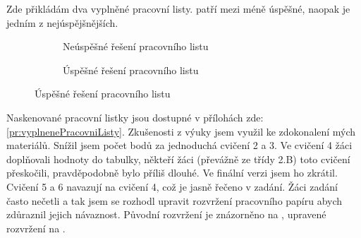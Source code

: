 {Zde přikládám dva vyplněné pracovní listy.  patří mezi méně úspěšné, naopak  je jedním z nejúspějšnějších.}
\begin{figure}[H]
    \begingroup
    \makeatletter
    \renewcommand\thesubfigure{\thefigure~--~\@nameuse{subfiglabel@\alph{subfigure}}}
    \newcommand{\subfiglabel@a}{nahoře}
    \newcommand{\subfiglabel@b}{dole}
    \captionsetup[subfigure]{labelformat=simple, labelsep=colon}
    \renewcommand\p@subfigure{}
    \makeatother
    \begin{subfigure}{\textwidth}
        \centering
        \hspace{1cm}
        \caption{Neúspěšné řešení pracovního listu \jaObr}
        \label{obr:prikladNeuspesny}
    \end{subfigure}\odst
    \begin{subfigure}{\textwidth}
        \centering
        \hspace{1cm}
        \caption{Úspěšné řešení pracovního listu \jaObr}
        \label{obr:prikladUspesny}
    \end{subfigure}
    \endgroup
\end{figure}
{Naskenované pracovní listky jsou dostupné v přílohách zde: \ref{pr:vyplnenePracovniListy}.}
\newpage
{Zkušenosti z výuky jsem využil ke zdokonalení mých materiálů. Snížil jsem počet bodů za jednoduchá cvičení 2 a 3. Ve cvičení 4 žáci doplňovali hodnoty do tabulky, někteří žáci (převážně ze třídy 2.B) toto cvičení přeskočili, pravděpodobně bylo příliš dlouhé. Ve finální verzi jsem ho zkrátil. Cvičení 5 a 6 navazují na cvičení 4, což je jasně řečeno v zadání. Žáci zadání často nečetli a tak jsem se rozhodl upravit rozvržení pracovního papíru abych zdůraznil jejich návaznost. Původní rozvržení je znázorněno na , upravené rozvržení na .}
